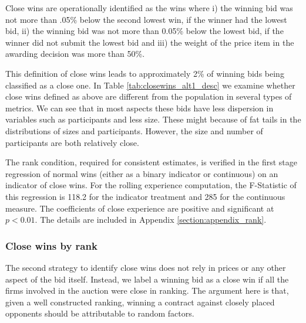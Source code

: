 Close wins are operationally identified as the wins where i) the winning bid was not more than .05\% below the second lowest win, if the winner had the lowest bid, ii) the winning bid was not more than 0.05\% below the lowest bid, if the winner did not submit the lowest bid and iii) the weight of the price item in the awarding decision was more than 50\%.

This definition of close wins leads to approximately 2\% of winning bids being classified as a close one. In Table \ref{tab:closewins_alt1_desc} we examine whether close wins defined as above are different from the population in several types of metrics. We can see that in most aspects these bids have less dispersion in variables such as participants and less size. These might because of fat tails in the distributions of sizes and participants. However, the size and number of participants are both relatively close.



The rank condition, required for consistent estimates, is verified in the first stage regression of normal wins (either as a binary indicator or continuous) on an indicator of close wins. For the rolling experience computation, the F-Statistic of this regression is 118.2 for the indicator treatment and 285 for the continuous measure. The coefficients of close experience are positive and significant at $p<0.01$. The details are included in Appendix \ref{section:appendix_rank}.

\subsubsection{Close wins by rank}

The second strategy to identify close wins does not rely in prices or any other aspect of the bid itself. Instead, we label a winning bid as a close win if all the firms involved in the auction were close in ranking. The argument here is that, given a well constructed ranking, winning a contract against closely placed opponents should be attributable to random factors.

